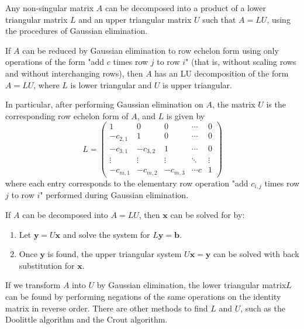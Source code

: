 \documentclass[../main.tex]{subfiles}
\begin{document}
Any non-singular matrix $A$ can be decomposed into a product of a lower triangular matrix $L$ and an upper triangular matrix $U$ such that $A = LU$, using the procedures of Gaussian elimination.

\begin{thm}
    If $A$ can be reduced by Gaussian elimination to row echelon form using only operations of the form "add $c$ times row $j$ to row $i$" (that is, without scaling rows and without interchanging rows), then $A$ has an LU decomposition of the form $A = LU$, where $L$ is lower triangular and $U$ is upper triangular.

    In particular, after performing Gaussian elimination on $A$, the matrix $U$ is the corresponding row echelon form of $A$, and $L$ is given by
    \[
        L = \begin{pmatrix}
        1 & 0 & 0 & \cdots & 0 \\
        -c_{2,1} & 1 & 0 & \cdots & 0 \\
        -c_{3,1} & -c_{3,2} & 1 & \cdots & 0 \\
        \vdots & \vdots & \vdots & \ddots & \vdots \\
        -c_{m,1} & -c_{m,2} & -c_{m,3} & \cdots c& 1
        \end{pmatrix}
    \]
    where each entry corresponds to the elementary row operation "add $c_{i,j}$ times row $j$ to row $i$" performed during Gaussian elimination.
\end{thm}

If $A$ can be decomposed into $A = LU$, then $\mathbf{x}$ can be solved for by:

\begin{enumerate}
    \item Let $\mathbf{y} = U\mathbf{x}$ and solve the system for $L\mathbf{y} = \mathbf{b}$.
    \item Once $\mathbf{y}$ is found, the upper triangular system $U\mathbf{x} = \mathbf{y}$ can be solved with back substitution for $\mathbf{x}$.
\end{enumerate}

If we transform $A$ into $U$ by Gaussian elimination, the lower triangular matrix$L$ can be found by performing negations of the same operations on the identity matrix in reverse order. There are other methods to find $L$ and $U$, such as the Doolittle algorithm and the Crout algorithm.
\end{document}
